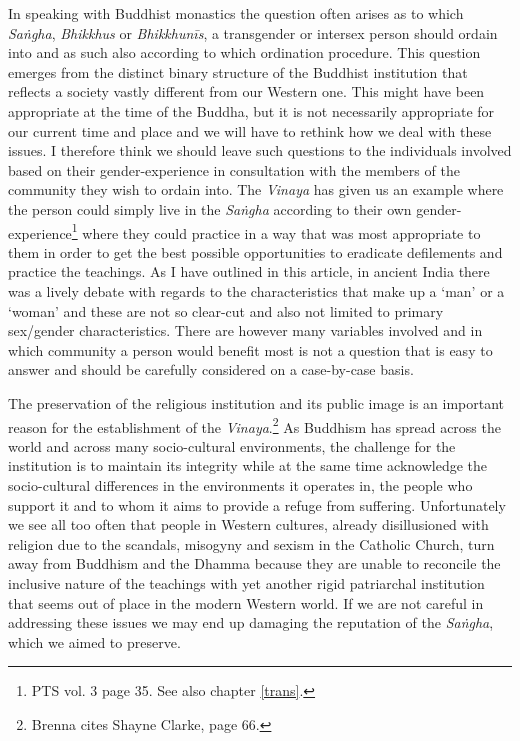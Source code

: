In speaking with Buddhist monastics the question often arises as to which {\em Saṅgha}, {\em Bhikkhus} or {\em Bhikkhunīs}, a transgender or intersex person should ordain into and as such also according to which ordination procedure. This question emerges from the distinct binary structure of the Buddhist institution that reflects a society vastly different from our Western one. This might have been appropriate at the time of the Buddha, but it is not necessarily appropriate for our current time and place and we will have to rethink how we deal with these issues. I therefore think we should leave such questions to the individuals involved based on their gender-experience in consultation with the members of the community they wish to ordain into. The {\em Vinaya} has given us an example where the person could simply live in the {\em Saṅgha} according to their own gender-experience\footnote{PTS vol. 3 page 35. See also chapter \ref{trans}.} where they could practice in a way that was most appropriate to them in order to get the best possible opportunities to eradicate defilements and practice the teachings. As I have outlined in this article, in ancient India there was a lively debate with regards to the characteristics that make up a `man' or a `woman' and these are not so clear-cut and also not limited to primary sex/gender characteristics. There are however many variables involved and in which community a person would benefit most is not a question that is easy to answer and should be carefully considered on a case-by-case basis. 

The preservation of the religious institution and its public image is an important reason for the establishment of the {\em Vinaya}.\footnote{Brenna \cite{artinger} cites Shayne Clarke, page 66.} As Buddhism has spread across the world and across many socio-cultural environments, the challenge for the institution is to maintain its integrity while at the same time acknowledge the socio-cultural differences in the environments it operates in, the people who support it and to whom it aims to provide a refuge from suffering. Unfortunately we see all too often that people in Western cultures, already disillusioned with religion due to the scandals, misogyny and sexism in the Catholic Church, turn away from Buddhism and the Dhamma because they are unable to reconcile the inclusive nature of the teachings with yet another rigid patriarchal institution that seems out of place in the modern Western world. If we are not careful in addressing these issues we may end up damaging the reputation of the {\em Saṅgha}, which we aimed to preserve.

